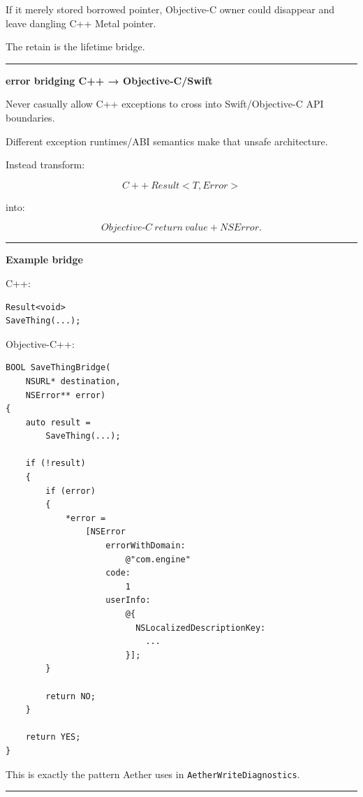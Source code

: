If it merely stored borrowed pointer, Objective-C owner could disappear and leave dangling C++ Metal pointer.

The retain is the lifetime bridge.

\begin{center}\rule{0.5\linewidth}{0.5pt}\end{center}

\textbf{error bridging C++ → Objective-C/Swift}

Never casually allow C++ exceptions to cross into Swift/Objective-C API boundaries.

Different exception runtimes/ABI semantics make that unsafe architecture.

Instead transform:

\[
C++\ Result<T,Error>
\]

into:

\[
Objective\text{-}C\ return\ value
+
NSError.
\]

\begin{center}\rule{0.5\linewidth}{0.5pt}\end{center}

\textbf{Example bridge}

C++:

\begin{verbatim}
Result<void>
SaveThing(...);
\end{verbatim}

Objective-C++:

\begin{verbatim}
BOOL SaveThingBridge(
    NSURL* destination,
    NSError** error)
{
    auto result =
        SaveThing(...);

    if (!result)
    {
        if (error)
        {
            *error =
                [NSError
                    errorWithDomain:
                        @"com.engine"
                    code:
                        1
                    userInfo:
                        @{
                          NSLocalizedDescriptionKey:
                            ...
                        }];
        }

        return NO;
    }

    return YES;
}
\end{verbatim}

This is exactly the pattern Aether uses in \texttt{AetherWriteDiagnostics}.

\begin{center}\rule{0.5\linewidth}{0.5pt}\end{center}

